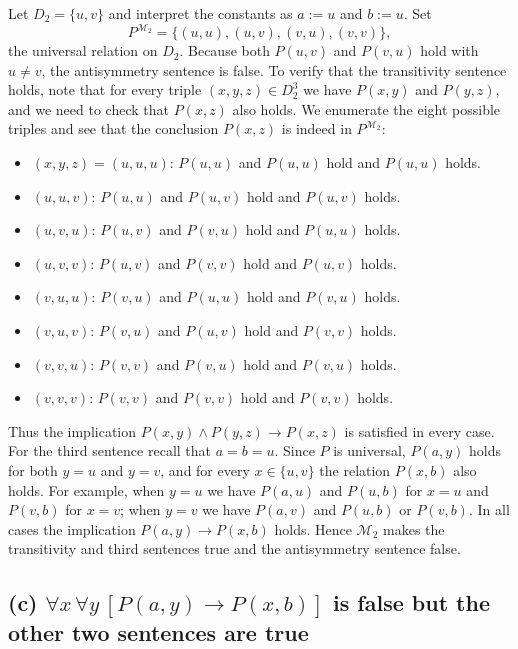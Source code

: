 \documentclass[12pt]{article}
\begin{document}
Let $D_2=\{u,v\}$ and interpret the constants as $a:=u$ and $b:=u$.  Set
\[
P^{\mathcal{M}_2} = \{(u,u),(u,v),(v,u),(v,v)\},
\]
the universal relation on $D_2$.  Because both $P(u,v)$ and $P(v,u)$ hold with $u\neq v$, the antisymmetry sentence is false.  To verify that the transitivity sentence holds, note that for every triple $(x,y,z)\in D_2^3$ we have $P(x,y)$ and $P(y,z)$, and we need to check that $P(x,z)$ also holds.  We enumerate the eight possible triples and see that the conclusion $P(x,z)$ is indeed in $P^{\mathcal{M}_2}$:
\begin{itemize}
  \item $(x,y,z)=(u,u,u)$: $P(u,u)$ and $P(u,u)$ hold and $P(u,u)$ holds.
  \item $(u,u,v)$: $P(u,u)$ and $P(u,v)$ hold and $P(u,v)$ holds.
  \item $(u,v,u)$: $P(u,v)$ and $P(v,u)$ hold and $P(u,u)$ holds.
  \item $(u,v,v)$: $P(u,v)$ and $P(v,v)$ hold and $P(u,v)$ holds.
  \item $(v,u,u)$: $P(v,u)$ and $P(u,u)$ hold and $P(v,u)$ holds.
  \item $(v,u,v)$: $P(v,u)$ and $P(u,v)$ hold and $P(v,v)$ holds.
  \item $(v,v,u)$: $P(v,v)$ and $P(v,u)$ hold and $P(v,u)$ holds.
  \item $(v,v,v)$: $P(v,v)$ and $P(v,v)$ hold and $P(v,v)$ holds.
\end{itemize}
Thus the implication $P(x,y)\wedge P(y,z)\to P(x,z)$ is satisfied in every case.  For the third sentence recall that $a=b=u$.  Since $P$ is universal, $P(a,y)$ holds for both $y=u$ and $y=v$, and for every $x\in\{u,v\}$ the relation $P(x,b)$ also holds.  For example, when $y=u$ we have $P(a,u)$ and $P(u,b)$ for $x=u$ and $P(v,b)$ for $x=v$; when $y=v$ we have $P(a,v)$ and $P(u,b)$ or $P(v,b)$.  In all cases the implication $P(a,y)\to P(x,b)$ holds.  Hence $\mathcal{M}_2$ makes the transitivity and third sentences true and the antisymmetry sentence false.

\subsection*{(c) $\forall x\,\forall y\,[P(a,y)\to P(x,b)]$ is false but the other two sentences are true}
\end{document}
